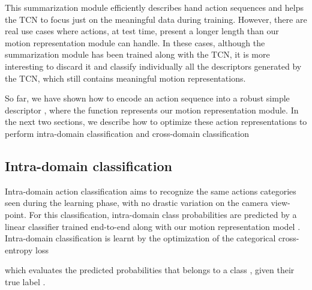\documentclass[letterpaper, 10 pt, conference]{ieeeconf}
\begin{document}
This summarization module efficiently describes hand action sequences and helps the TCN to focus just on the meaningful data during training. However, there are real use cases where actions, at test time, present a longer length than our motion representation module can handle. In these cases, although the summarization module has been trained along with the TCN, 
it is more interesting to discard it and classify individually all the descriptors generated by the TCN, which still contains meaningful motion representations. 



So far, we have shown how to encode an action sequence  into a robust simple descriptor , where the function  represents our motion representation module. In the next two sections, we describe how to optimize these action representations to perform intra-domain classification and cross-domain classification







\subsection{Intra-domain classification}\label{sec:intra_dom}


Intra-domain action classification aims to recognize the same actions categories seen during the learning phase, with no drastic variation on the camera view-point. For this classification, intra-domain class probabilities  are predicted by a linear classifier  trained end-to-end along with our motion representation model . Intra-domain classification is learnt by the optimization of the categorical cross-entropy loss


which evaluates the predicted probabilities  that belongs to a class , given their true label .
\end{document}
